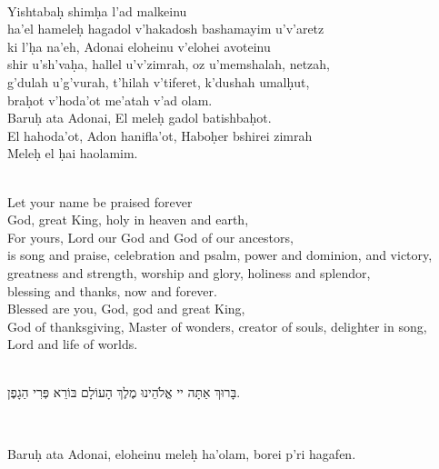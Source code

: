 \documentclass[a4paper,10pt,openany]{memoir}
\newcommand{\HgInst}[1]{{\noindent\sffamily{\bfseries{#1}}}}
\newenvironment{HgEnglish}{\strut\\\noindent}{\vspace{1em}}
\newenvironment{HgTranslit}{\strut\\\noindent\begin{itshape}}{\end{itshape}\vspace{1em}}
\newenvironment{HgHebrew}{\begin{hebrew}\strut\\\noindent\Large}{\end{hebrew}}
\begin{document}
\begin{HgTranslit}
  Yishtaba\d{h} shim\d{h}a l'ad malkeinu \\
  ha'el hamele\d{h} hagadol v'hakadosh bashamayim u'v'aretz \\
  ki l'\d{h}a na'eh, Adonai eloheinu v'elohei avoteinu \\
  shir u'sh'va\d{h}a, hallel u'v'zimrah, oz u'memshalah, netzah, \\
  g'dulah u'g'vurah, t'hilah v'tiferet, k'dushah umal\d{h}ut, \\
  bra\d{h}ot v'hoda'ot me'atah v'ad olam. \\
  Baru\d{h} ata Adonai, El mele\d{h} gadol batishba\d{h}ot. \\
  El hahoda'ot, Adon hanifla'ot, Habo\d{h}er bshirei zimrah \\
  Mele\d{h} el \d{h}ai haolamim.
\end{HgTranslit}

\begin{HgEnglish}
  Let your name be praised forever \\
  God, great King, holy in heaven and earth, \\
  For yours, Lord our God and God of our ancestors, \\
  is song and praise, celebration and psalm, power and dominion, and victory, \\
  greatness and strength, worship and glory, holiness and splendor, \\
  blessing and thanks, now and forever. \\
  Blessed are you, God, god and great King, \\
  God of thanksgiving, Master of wonders, creator of souls, delighter in song, \\
  Lord and life of worlds.
\end{HgEnglish}

\HgInst{One more time:}
\vspace{-1em}

\begin{HgHebrew} 
  בָּרוּךְ אַתָּה יי אֱלֹהֵינוּ מֶלֶךְ הָעוֹלָם בּוֹרֵא פְּרִי הַגָפֶן.
\end{HgHebrew}

\begin{HgTranslit}
  Baru\d{h} ata Adonai, eloheinu mele\d{h} ha'olam,
  borei p'ri hagafen.
\end{HgTranslit}
\vspace{-2em}
\end{document}
